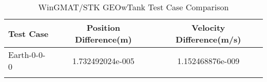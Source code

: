 \begin{table}[htbp!]
\centering
\caption{ WinGMAT/STK GEOwTank Test Case Comparison}
      \begin{tabular}{lcc}
      \hline\hline
          Test Case & Position Difference(m) & Velocity Difference(m/s) \\
         \hline
         Earth-0-0-0 & 1.732492024e-005 & 1.152468876e-009 \\
      \hline\hline
      \label{Table: GEOwTank WinGMAT-STK Table} 
\end{tabular}
\end{table}
